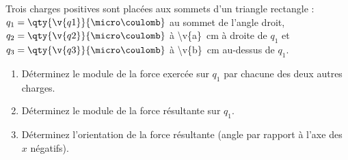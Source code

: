 Trois charges positives sont placées aux sommets d'un triangle rectangle : $q_1 = \qty{\v{q1}}{\micro\coulomb}$ au sommet de l'angle droit, $q_2 = \qty{\v{q2}}{\micro\coulomb}$ à \qty{\v{a}}{cm} à droite de $q_1$ et $q_3 = \qty{\v{q3}}{\micro\coulomb}$ à \qty{\v{b}}{cm} au-dessus de $q_1$.

\begin{center}
\end{center}

\begin{enumerate}[label=\alph*)]
    \item Déterminez le module de la force exercée sur $q_1$ par chacune des deux autres charges.
    \item Déterminez le module de la force résultante sur $q_1$.
    \item Déterminez l'orientation de la force résultante (angle par rapport à l'axe des $x$ négatifs).
\end{enumerate}
